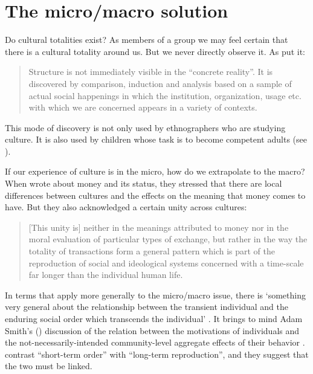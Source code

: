 
\chapter{The micro/macro solution}
\label{micromacrosolution}

Do cultural totalities exist? As members of a group we may feel certain that 
there is a cultural totality around us. But we never directly observe it. As 
\citet[56]{fortes_social_1949} put it:

\begin{quotation}
Structure is not immediately visible in the ``concrete 
reality''. It is discovered by comparison, induction and analysis based 
on a sample of actual social happenings in which the institution, 
organization, usage etc. with which we are concerned appears in a 
variety of contexts. \citep[56]{fortes_social_1949}
\end{quotation}

This mode of discovery is not only used by ethnographers who are studying culture. It is also used by children whose task is to become competent adults (see \citealt{brown_language_2014}). 



If our experience of culture is in the micro, how do we 
extrapolate to the macro? When \citeauthor{parry_money_1989} wrote about money 
and its status, they stressed that there are local differences between cultures and the 
effects on the meaning that money comes to have. But they also acknowledged a 
certain unity across cultures: 

\begin{quotation}
[This unity is] neither in the meanings 
attributed to money nor in the moral evaluation of particular types of 
exchange, but rather in the way the totality of transactions form a 
general pattern which is part of the reproduction of social and 
ideological systems concerned with a time-scale far longer than the 
individual human life. \citep[1]{parry_money_1989} 
\end{quotation}



In terms that apply more generally to the micro/macro issue, there is \textquoteleft something very general about the relationship between the 
transient individual and the enduring social order which transcends the 
individual' \citep[2]{parry_money_1989}. It brings to mind Adam Smith's (\citeyear[book 4, ch. 2]{smith_inquiry_1776}) discussion of the relation between the 
motivations of individuals and the not-necessarily-intended 
community-level aggregate effects of their behavior \citep{schelling_micromotives_1978,hedstrom_social_1998,rogers_diffusion_2003}. \citet[29]{parry_money_1989} contrast ``short-term order'' with ``long-term reproduction'', and they suggest that the two must be linked. 




